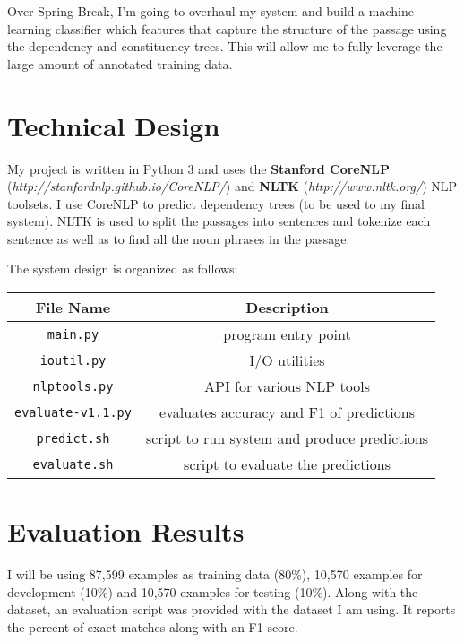 \documentclass[a4paper, 11pt]{article} %
\begin{document}
Over Spring Break, I'm going to overhaul my system and build a machine learning classifier which features that capture the structure of the passage using the dependency and constituency trees. This will allow me to fully leverage the large amount of annotated training data.

\section*{Technical Design}

My project is written in Python 3 and uses the \textbf{Stanford CoreNLP} \newline (\textit{http://stanfordnlp.github.io/CoreNLP/}) and \textbf{NLTK} (\textit{http://www.nltk.org/}) NLP toolsets. I use CoreNLP to predict dependency trees (to be used to my final system). NLTK is used to split the passages into sentences and tokenize each sentence as well as to find all the noun phrases in the passage.

The system design is organized as follows: 

\begin{table}[H]
\centering
{\renewcommand{\arraystretch}{1.2}%
\begin{tabular}{| c | c |}
\hline
File Name & Description\\
\hline
\texttt{main.py} & program entry point\\ \hline
\texttt{ioutil.py} & I/O utilities\\ \hline
\texttt{nlptools.py} & API for various NLP tools\\ \hline
\texttt{evaluate-v1.1.py} & evaluates accuracy and F1 of predictions \\ \hline
\texttt{predict.sh} & script to run system and produce predictions\\ \hline
\texttt{evaluate.sh} & script to evaluate the predictions\\ \hline
\end{tabular}}
\end{table}

\section*{Evaluation Results}

I will be using 87,599 examples as training data (80\%), 10,570 examples for development (10\%) and 10,570 examples for testing (10\%). Along with the dataset, an evaluation script was provided with the dataset I am using. It reports the percent of exact matches along with an F1 score.
\end{document}
